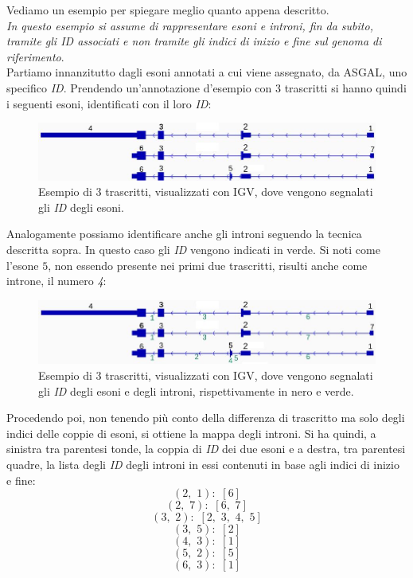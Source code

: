 \documentclass[a4paper,12pt, oneside]{book}
\begin{document}
\begin{esempio}
  Vediamo un esempio per spiegare meglio quanto appena descritto.\\
  \emph{In questo esempio si assume di rappresentare esoni e introni, fin da
    subito, tramite gli \textit{ID} associati e non tramite gli indici di inizio
    e fine sul genoma di riferimento}.\\
  Partiamo innanzitutto dagli esoni annotati a cui viene assegnato, da ASGAL,
  uno specifico \textit{ID}. Prendendo un'annotazione d'esempio con 3 trascritti
  si hanno quindi i seguenti esoni, identificati con il loro \textit{ID}:
  \begin{center}
    \begin{figure}[H]
      \centering
      \includegraphics[scale = 0.48]{img/en3.jpg}
      \caption{Esempio di 3 trascritti, visualizzati con IGV, dove vengono
      segnalati gli \textit{ID} degli esoni.}
    \end{figure}
    
  \end{center}
  Analogamente possiamo identificare anche gli introni seguendo la tecnica
  descritta sopra. In questo caso gli \textit{ID} vengono indicati in verde. Si
  noti come l'esone $5$, non essendo presente nei primi due trascritti, risulti
  anche come introne, il numero \textit{4}: 
  \begin{center}
    \begin{figure}[H]
      \centering
      \includegraphics[scale = 0.48]{img/in2.jpg}
       \caption{Esempio di 3 trascritti, visualizzati con IGV, dove vengono
      segnalati gli \textit{ID} degli esoni e degli introni, rispettivamente in
      nero e verde.}
    \label{img:int}
    \end{figure}
    
    
  \end{center}
  Procedendo poi, non tenendo più conto della differenza di trascritto ma solo
  degli indici delle coppie di esoni, si ottiene la mappa degli introni. Si ha
  quindi, a sinistra tra parentesi tonde, la coppia di \textit{ID} dei due esoni
  e a destra, tra parentesi quadre, la lista degli \textit{ID} degli introni in
  essi contenuti in base agli indici di inizio e fine:
  \[(2,\,\,1):\,\, [6]\]
  \[(2,\,\,7):\,\, [6,\,\,7]\]
  \[(3,\,\,2):\,\, [2,\,\,3,\,\,4,\,\,5]\]
  \[(3,\,\,5):\,\, [2]\]
  \[(4,\,\,3):\,\, [1]\]
  \[(5,\,\,2):\,\, [5]\]
  \[(6,\,\,3):\,\, [1]\]
\end{esempio}
\end{document}
